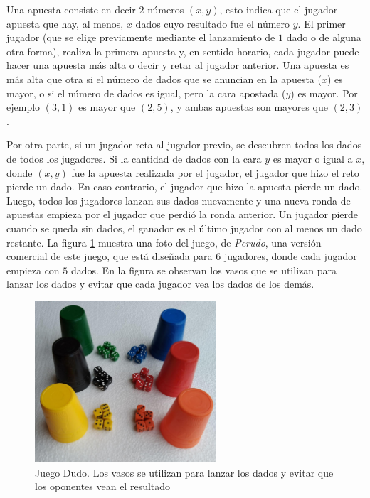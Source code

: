 Una apuesta consiste en decir $2$ números $(x, y)$, esto indica que el jugador apuesta que hay, al menos, $x$ dados cuyo resultado fue el número $y$. El primer jugador (que se elige previamente mediante el lanzamiento de $1$ dado o de alguna otra forma), realiza la primera apuesta y, en sentido horario, cada jugador puede hacer una apuesta más alta o decir  y retar al jugador anterior. Una apuesta es más alta que otra si el número de dados que se anuncian en la apuesta ($x$) es mayor, o si el número de dados es igual, pero la cara apostada ($y$) es mayor. Por ejemplo $(3, 1)$ es mayor que $(2, 5)$, y ambas apuestas son mayores que $(2, 3)$.

Por otra parte, si un jugador reta al jugador previo, se descubren todos los dados de todos los jugadores. Si la cantidad de dados con la cara $y$ es mayor o igual a $x$, donde $(x, y)$ fue la apuesta realizada por el jugador, el jugador que hizo el reto pierde un dado. En caso contrario, el jugador que hizo la apuesta pierde un dado. Luego, todos los jugadores lanzan sus dados nuevamente y una nueva ronda de apuestas empieza por el jugador que perdió la ronda anterior. Un jugador pierde cuando se queda sin dados, el ganador es el último jugador con al menos un dado restante. La figura \ref{fig:dudo} muestra una foto del juego, de \textit{Perudo}, una versión comercial de este juego, que está diseñada para $6$ jugadores, donde cada jugador empieza con $5$ dados. En la figura se observan los vasos que se utilizan para lanzar los dados y evitar que cada jugador vea los dados de los demás.

\begin{figure}[htb]
\caption[Juego Dudo]{Juego Dudo. Los vasos se utilizan para lanzar los dados y evitar que los oponentes vean el resultado}
\label{fig:dudo}
\centering
\includegraphics[width=0.6\textwidth]{figuras/dudo.jpg}
\end{figure}

